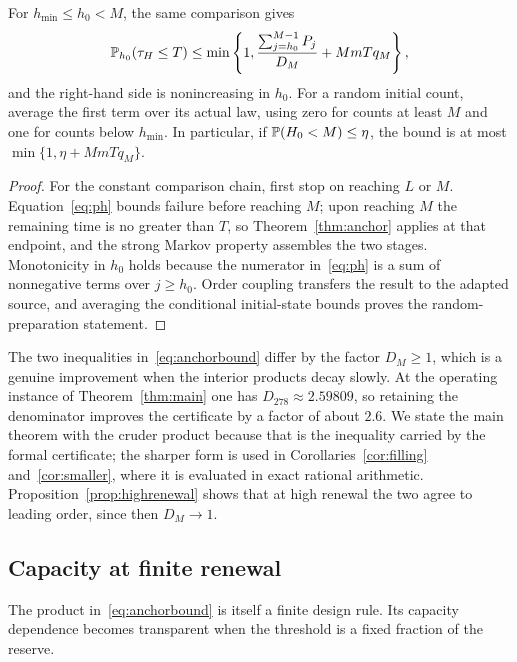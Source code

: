 \begin{corollary}\label{cor:initial}
For $h_{\min}\le h_0<M$, the same comparison gives
\begin{equation}\label{eq:initial}
 \mathbb P_{h_0}(\tau_H\le T)\le
 \min\left\{1,\frac{\sum_{j=h_0}^{M-1}P_j}{D_M}+MmTq_M\right\},
\end{equation}
and the right-hand side is nonincreasing in $h_0$. For a random initial count, average the first term over its actual law, using zero for counts at least $M$ and one for counts below $h_{\min}$. In particular, if $\mathbb P(H_0<M)\le\eta$, the bound is at most $\min\{1,\eta+MmTq_M\}$.
\end{corollary}
\begin{proof}
For the constant comparison chain, first stop on reaching $L$ or $M$. Equation~\eqref{eq:ph} bounds failure before reaching $M$; upon reaching $M$ the remaining time is no greater than $T$, so Theorem~\ref{thm:anchor} applies at that endpoint, and the strong Markov property assembles the two stages. Monotonicity in $h_0$ holds because the numerator in~\eqref{eq:ph} is a sum of nonnegative terms over $j\ge h_0$. Order coupling transfers the result to the adapted source, and averaging the conditional initial-state bounds proves the random-preparation statement.
\end{proof}

\begin{remark}\label{rem:whichbound}
The two inequalities in~\eqref{eq:anchorbound} differ by the factor $D_M\ge1$, which is a genuine improvement when the interior products decay slowly. At the operating instance of Theorem~\ref{thm:main} one has $D_{278}\approx2.59809$, so retaining the denominator improves the certificate by a factor of about $2.6$. We state the main theorem with the cruder product because that is the inequality carried by the formal certificate; the sharper form is used in Corollaries~\ref{cor:filling} and~\ref{cor:smaller}, where it is evaluated in exact rational arithmetic. Proposition~\ref{prop:highrenewal} shows that at high renewal the two agree to leading order, since then $D_M\to1$.
\end{remark}

\subsection{Capacity at finite renewal}\label{sec:capacity}
The product in~\eqref{eq:anchorbound} is itself a finite design rule. Its capacity dependence becomes transparent when the threshold is a fixed fraction of the reserve.

